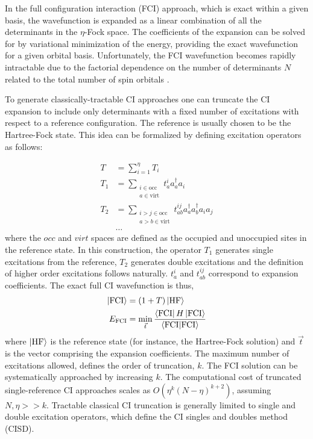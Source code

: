\documentclass[superscriptaddress,aps,pra,twocolumn,nofootinbib,babel]{revtex4-1}
\def\bra#1{\mathinner{\langle{#1}|}}
\def\ket#1{\mathinner{|{#1}\rangle}}
\newcommand{\braket}[2]{\langle #1|#2\rangle}
\begin{document}
In the full configuration interaction (FCI) approach, which is exact within a given basis, the wavefunction is expanded as a linear combination of all the determinants in the $\eta$-Fock space. The coefficients of the expansion can be solved for by variational minimization of the energy, providing the exact wavefunction for a given orbital basis. Unfortunately, the FCI wavefunction becomes rapidly intractable due to the factorial dependence on the number of determinants $N$ related to the total number of spin orbitals \cite{Helgaker2013}.

To generate classically-tractable CI approaches one can truncate the CI expansion to include only determinants with a fixed number of excitations with respect to a reference configuration. The reference is usually chosen to be the Hartree-Fock state. This idea can be formalized by defining excitation operators as follows:

\begin{align}\label{eq:Tsum}
T&=\sum^{\eta}_{i=1} T_i\\
T_1&=\sum_{\substack{i \in \text{occ}\\ a \in \text{virt}}} t^{i}_{a} a^{\dagger}_{a} a_{i} \\
T_2&=\sum_{\substack{i>j\in \text{occ}\\ a>b \in \text{virt}}} t^{i j}_{a b} a^{\dagger}_{a} a^{\dagger}_{b} a_{i} a_{j}\\
\nonumber&\ldots %
\end{align}
where the $occ$ and $virt$ spaces are defined as the occupied and unoccupied sites in the reference state. In this construction, the operator $T_1$ generates single excitations from the reference, $T_2$ generates double excitations and the definition of higher order excitations follows naturally. $t^{i}_{a}$ and $t^{i j}_{a b}$ correspond to expansion coefficients. The exact full CI wavefunction is thus,
\begin{align}
\ket{\textrm{FCI}} & = (1+T) \ket{\textrm{HF}}\\
E_{\textrm{FCI}} & = \min_{\vec{t}} \frac{\bra{\textrm{FCI}} H \ket{\textrm{FCI}}}{\braket{\textrm{FCI}}{\textrm{FCI}}}\nonumber
\end{align}
where $\ket{\textrm{HF}}$ is the reference state (for instance, the Hartree-Fock solution) and $\vec{t}$ is the vector comprising the expansion coefficients. The maximum number of excitations allowed, defines the order of truncation, $k$. The FCI solution can be systematically approached by increasing $k$. The computational cost of truncated single-reference CI approaches scales as $O(\eta^{k} (N-\eta)^{k+2})$, assuming $N,\eta>>k$. Tractable classical CI truncation is generally limited to single and double excitation operators, which define the CI singles and doubles method (CISD). 
\end{document}
